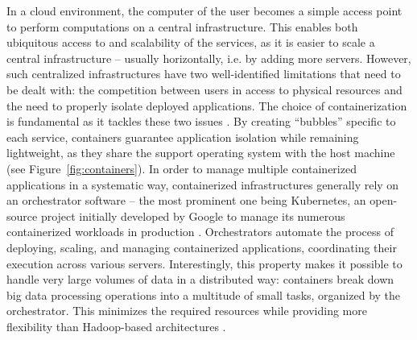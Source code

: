 \documentclass[graybox]{svmult}
\begin{document}
In a cloud environment, the computer of the user becomes a simple access point to perform computations on a central infrastructure. This enables both ubiquitous access to and scalability of the services, as it is easier to scale a central infrastructure -- usually horizontally, i.e. by adding more servers. However, such centralized infrastructures have two well-identified limitations that need to be dealt with: the competition between users in access to physical resources and the need to properly isolate deployed applications. The choice of containerization is fundamental as it tackles these two issues \citep{bentaleb2022containerization}. By creating “bubbles” specific to each service, containers guarantee application isolation while remaining lightweight, as they share the support operating system with the host machine (see  Figure~\ref{fig:containers}). In order to manage multiple containerized applications in a systematic way, containerized infrastructures generally rely on an orchestrator software -- the most prominent one being Kubernetes, an open-source project initially developed by Google to manage its numerous containerized workloads in production \citep{vano2023cloud}. Orchestrators automate the process of deploying, scaling, and managing containerized applications, coordinating their execution across various servers. Interestingly, this property makes it possible to handle very large volumes of data in a distributed way: containers break down big data processing operations into a multitude of small tasks, organized by the orchestrator. This minimizes the required resources while providing more flexibility than Hadoop-based architectures \citep{zhang2018comparative}.
\end{document}
